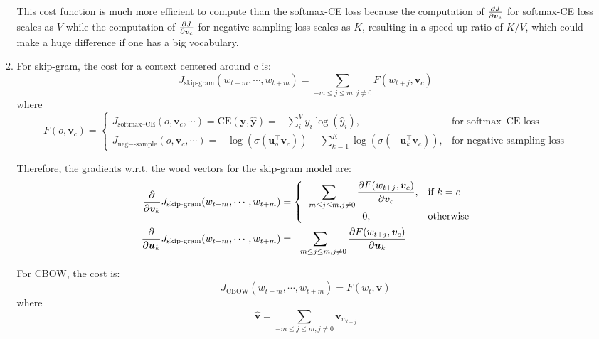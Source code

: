 \documentclass[10pt,reqno]{amsart}
\begin{document}
\begin{enumerate}[topsep=0pt,itemsep=2ex,partopsep=1ex,parsep=1ex]
\begin{enumerate}
    This cost function is much more efficient to compute than the softmax-CE loss 
    because the computation of $\frac{\partial J}{\partial \bm{v}_c}$ for softmax-CE loss scales as $V$
    while the computation of $\frac{\partial J}{\partial \bm{v}_c}$ for negative sampling loss scales as $K$, 
    resulting in a speed-up ratio of $K/V$,
    which could make a huge difference if one has a big vocabulary.

  \item
    For skip-gram, the cost for a context centered around c is:
    \begin{equation*}
      J_\text{skip-gram}(w_{t-m},\cdots,w_{t+m})
      = \sum_{-m \leq j \leq m, j \neq 0} F(w_{t+j}, \bm{v}_c)
    \end{equation*}
    where
    \begin{equation*}
      F(o, \bm{v}_c) = 
      \begin{cases}
        J_\text{softmax--CE}(o, \bm{v}_c, \cdots) = \text{CE}(\bm{y}, \bm{\hat{y}}) = - \displaystyle\sum_i^V y_i \log(\hat{y}_i), & \text{for softmax--CE loss} \\
        J_\text{neg−-sample}(o, \bm{v}_c, \cdots) = -\log(\sigma(\bm{u}_o^\top \bm{v}_c)) - \displaystyle\sum_{k=1}^K \log(\sigma(-\bm{u}_k^\top \bm{v}_c)), & \text{for negative sampling loss}
      \end{cases}
    \end{equation*}

    Therefore, the gradients w.r.t. the word vectors for the skip-gram model are:
    \begin{align*}
      \frac{\partial}{\partial \bm{v}_k} J_\text{skip-gram}(w_{t-m},\cdots,w_{t+m}) &= 
      \begin{cases}
        \displaystyle\sum_{-m \leq j \leq m, j \neq 0} \frac{\partial F(w_{t+j}, \bm{v}_c)}{\partial \bm{v}_c}, & \text{if}\ k = c \\
        \qquad\qquad\qquad 0, & \text{otherwise}
      \end{cases}\\
      \frac{\partial}{\partial \bm{u}_k} J_\text{skip-gram}(w_{t-m},\cdots,w_{t+m}) 
      &= \sum_{-m \leq j \leq m, j \neq 0} \frac{\partial F(w_{t+j}, \bm{v}_c)}{\partial \bm{u}_k} 
    \end{align*}

    For CBOW, the cost is:
    \begin{equation*}
      J_\text{CBOW}(w_{t-m},\cdots,w_{t+m}) = F(w_t, \bm{\hat{v}})
    \end{equation*}
    where
    \begin{equation*}
      \bm{\hat{v}} = \sum_{-m \leq j \leq m, j \neq 0} \bm{v}_{w_{t+j}}
    \end{equation*}


\end{enumerate}
\end{enumerate}
\end{document}
